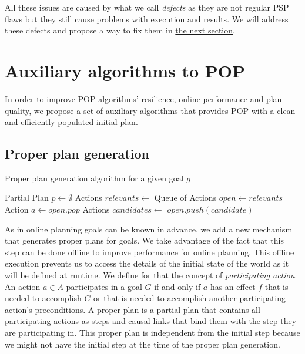 \documentclass[]{article}
\begin{document}
All these issues are caused by what we call \emph{defects} as they are
not regular PSP flaws but they still cause problems with execution and
results. We will address these defects and propose a way to fix them in
\protect\hyperlink{defects}{the next section}.

\section{Auxiliary algorithms to POP}\label{auxiliary-algorithms-to-pop}

In order to improve POP algorithms' resilience, online performance and
plan quality, we propose a set of auxiliary algorithms that provides POP
with a clean and efficiently populated initial plan.

\subsection{Proper plan generation}\label{proper-plan-generation}

\begin{algorithm}\caption{Proper plan generation algorithm for a given goal $g$}\label{properplan}\begin{algorithmic}

 \State Partial Plan
\(p \gets \emptyset\) \State Actions \(relevants \gets\)
\State Queue of Actions \(open \gets relevants\)
 \State Action \(a\gets open.pop\)
\State Actions \(candidates \gets\) 
 
\State \(open.push(candidate)\) \EndIf
        \EndFor
    \EndWhile
\EndFunction

\end{algorithmic}\end{algorithm}

As in online planning goals can be known in advance, we add a new
mechanism that generates proper plans for goals. We take advantage of
the fact that this step can be done offline to improve performance for
online planning. This offline execution prevents us to access the
details of the initial state of the world as it will be defined at
runtime. We define for that the concept of \emph{participating action}.
An action \(a \in A\) participates in a goal \(G\) if and only if \(a\)
has an effect \(f\) that is needed to accomplish \(G\) or that is needed
to accomplish another participating action's preconditions. A proper
plan is a partial plan that contains all participating actions as steps
and causal links that bind them with the step they are participating in.
This proper plan is independent from the initial step because we might
not have the initial step at the time of the proper plan generation.
\end{document}
